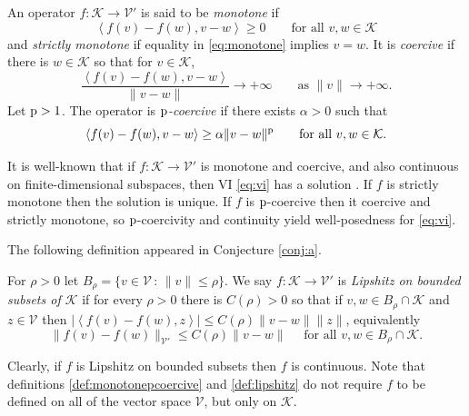 \documentclass[hidelinks,onefignum,onetabnum,final]{siamart220329}  %
\newcommand{\cK}{\mathcal{K}}
\newcommand{\cV}{\mathcal{V}}
\newcommand{\pp}{{\text{\textnormal{p}}}}
\newcommand{\ip}[2]{\left<#1,#2\right>}
\begin{document}
\begin{definition} \label{def:monotonepcoercive}
An operator $f:\cK \to \cV'$ is said to be \emph{monotone} if
\begin{equation}
\ip{f(v)-f(w)}{v-w} \ge 0 \qquad \text{for all } v,w \in \cK \label{eq:monotone}
\end{equation}
and \emph{strictly monotone} if equality in \eqref{eq:monotone} implies $v=w$.  It is \emph{coercive} if there is $w\in \cK$ so that for $v \in \cK$,
\begin{equation}
\frac{\ip{f(v)-f(w)}{v-w}}{\|v-w\|} \to +\infty \qquad \text{as } \|v\| \to +\infty. \label{eq:coercive}
\end{equation}
Let $\pp>1$.  The operator is \emph{$\pp$-coercive \cite{Bueler2021conservation}} if there exists $\alpha>0$ such that
\begin{equation}
\ip{f(v)-f(w)}{v-w} \ge \alpha \|v-w\|^\pp \qquad \text{for all } v,w \in \cK. \label{eq:pcoercive}
\end{equation}
\end{definition}

It is well-known that if $f:\cK \to \cV'$ is monotone and coercive, and also continuous on finite-dimensional subspaces, then VI \eqref{eq:vi} has a solution \cite[Corollary III.1.8]{KinderlehrerStampacchia1980}.  If $f$ is strictly monotone then the solution is unique.  If $f$ is $\pp$-coercive then it coercive and strictly monotone, so $\pp$-coercivity and continuity yield well-posedness for \eqref{eq:vi}.

The following definition appeared in Conjecture \ref{conj:a}.

\begin{definition} \label{def:lipshitz}
For $\rho>0$ let $B_\rho = \{v\in \cV\,:\,\|v\|\le \rho\}$.  We say $f:\cK \to \cV'$ is \emph{Lipshitz on bounded subsets of $\cK$} if for every $\rho>0$ there is $C(\rho)>0$ so that if $v,w \in B_\rho \cap \cK$ and $z\in\cV$ then $|\ip{f(v)-f(w)}{z}| \le C(\rho) \|v-w\| \|z\|$, equivalently
\begin{equation}
\|f(v)-f(w)\|_{\cV'} \le C(\rho) \|v-w\| \quad \text{ for all } v,w \in B_\rho \cap \cK.  \label{eq:liponbounded}
\end{equation}
\end{definition}

Clearly, if $f$ is Lipshitz on bounded subsets then $f$ is continuous.  Note that definitions \ref{def:monotonepcoercive} and \ref{def:lipshitz} do not require $f$ to be defined on all of the vector space $\cV$, but only on $\cK$.
\end{document}
